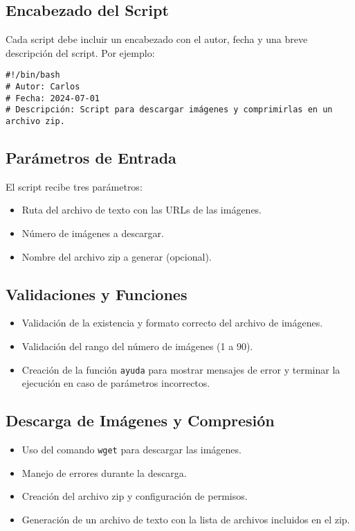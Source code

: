 \documentclass{article}
\begin{document}
\subsection{Encabezado del Script}
Cada script debe incluir un encabezado con el autor, fecha y una breve descripción del script. Por ejemplo:
\begin{verbatim}
#!/bin/bash
# Autor: Carlos
# Fecha: 2024-07-01
# Descripción: Script para descargar imágenes y comprimirlas en un archivo zip.
\end{verbatim}

\subsection{Parámetros de Entrada}
El script recibe tres parámetros:
\begin{itemize}
    \item Ruta del archivo de texto con las URLs de las imágenes.
    \item Número de imágenes a descargar.
    \item Nombre del archivo zip a generar (opcional).
\end{itemize}

\subsection{Validaciones y Funciones}
\begin{itemize}
    \item Validación de la existencia y formato correcto del archivo de imágenes.
    \item Validación del rango del número de imágenes (1 a 90).
    \item Creación de la función \texttt{ayuda} para mostrar mensajes de error y terminar la ejecución en caso de parámetros incorrectos.
\end{itemize}

\subsection{Descarga de Imágenes y Compresión}
\begin{itemize}
    \item Uso del comando \texttt{wget} para descargar las imágenes.
    \item Manejo de errores durante la descarga.
    \item Creación del archivo zip y configuración de permisos.
    \item Generación de un archivo de texto con la lista de archivos incluidos en el zip.
\end{itemize}
\end{document}
